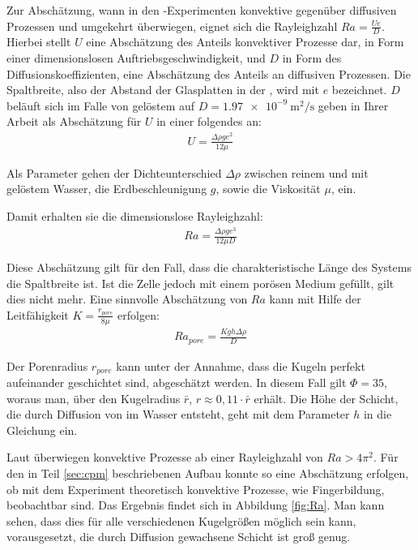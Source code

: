 
Zur Abschätzung, wann in den \HSC-Experimenten konvektive gegenüber diffusiven Prozessen und umgekehrt überwiegen, eignet sich die Rayleighzahl $Ra = \frac{Ue}{D}$. Hierbei stellt $U$ eine Abschätzung des Anteils konvektiver Prozesse dar, in Form einer dimensionslosen Auftriebsgeschwindigkeit, und $D$ in Form des Diffusionskoeffizienten, eine Abschätzung des Anteils an diffusiven Prozessen. Die Spaltbreite, also der Abstand der Glasplatten in der \HSC, wird mit $e$ bezeichnet.
$D$ beläuft sich im Falle von gelöstem \COT auf $D = \SI{1,97e-9}{\meter\squared\per\second}$
\cite{fernandez} geben in Ihrer Arbeit als Abschätzung für $U$ in einer \HSC folgendes an:
\begin{align}
 U = \frac{\Delta\rho g e^2}{12 \mu}
\end{align}

Als Parameter gehen der Dichteunterschied $\Delta\rho$ zwischen reinem und mit \COT gelöstem Wasser, die Erdbeschleunigung $g$, sowie die Viskosität $\mu$, ein.

Damit erhalten sie die dimensionslose Rayleighzahl:
\begin{align}
 Ra = \frac{\Delta\rho g e^3}{12 \mu D}
\end{align}


Diese Abschätzung gilt für den Fall, dass die charakteristische Länge des Systems die Spaltbreite ist. Ist die Zelle jedoch mit einem porösen Medium gefüllt, gilt dies nicht mehr.
Eine sinnvolle Abschätzung von $Ra$ kann mit Hilfe der Leitfähigkeit $K = \frac{r_{pore}}{8\mu}$ erfolgen:
\begin{align}
 Ra_{pore} = \frac{K g h \Delta \rho}{D}
\end{align}

Der Porenradius $r_{pore}$ kann unter der Annahme, dass die Kugeln perfekt aufeinander geschichtet sind, abgeschätzt werden. In diesem Fall gilt $\Phi=35$, woraus man, über den Kugelradius $\bar{r}$, $r \approx 0,11 \cdot \bar{r}$ erhält.
Die Höhe der Schicht, die durch Diffusion von \COT im Wasser entsteht, geht mit dem Parameter $h$ in die Gleichung ein.

Laut \cite{kneafsy} überwiegen konvektive Prozesse ab einer Rayleighzahl von $Ra > 4\pi^2$. Für den in Teil \ref{sec:cpm} beschriebenen Aufbau konnte so eine Abschätzung erfolgen, ob mit dem Experiment theoretisch konvektive Prozesse, wie Fingerbildung, beobachtbar sind. Das Ergebnis findet sich in Abbildung \ref{fig:Ra}. Man kann sehen, dass dies für alle verschiedenen Kugelgrößen möglich sein kann, vorausgesetzt, die durch Diffusion gewachsene Schicht ist groß genug.